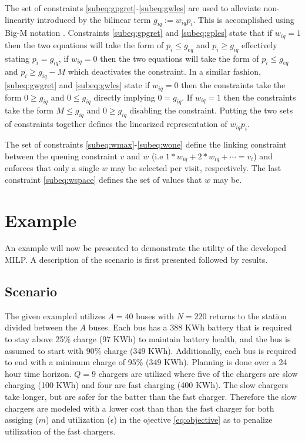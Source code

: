 \documentclass[letterpaper, 10pt, conference]{IEEEtran}
\begin{document}
The set of constraints \eqref{subeq:gpgret}-\eqref{subeq:gwles} are used to alleviate non-linearity introduced by the bilinear term \(g_{iq} := w_{iq} p_i\). This is accomplished using Big-M notation \cite{Rodriguez2013}. Constraints \eqref{subeq:gpgret} and \eqref{subeq:gples} state that if \(w_{iq} = 1\) then the two equations will take the form of \(p_i \leq g_{eq}\) and \(p_i \geq g_{iq}\) effectively stating \(p_i = g_{iq}\), if \(w_{iq} = 0\) then the two equations will take the form of \(p_i \leq g_{eq}\) and \(p_i \geq g_{iq} - M\) which deactivates the constraint. In a similar fashion, \eqref{subeq:gwgret} and \eqref{subeq:gwles} state if \(w_{iq} = 0\) then the constraints take the form \(0 \geq g_{iq}\) and \(0 \leq g_{iq}\) directly implying \(0 = g_{iq}\). If \(w_{iq} = 1\) then the constraints take the form \(M \leq g_{iq}\) and \(0 \geq g_{iq}\) disabling the constraint. Putting the two sets of constraints together defines the linearized representation of \(w_{iq} p_i\).

The set of constraints \eqref{subeq:wmax}-\eqref{subeq:wone} define the linking constraint between the queuing constraint \(v\) and \(w\) (i.e \(1*w_{iq} + 2*w_{iq} + \cdots = v_i\)) and enforces that only a single \(w\) may be selected per visit, respectively. The last constraint \eqref{subeq:wspace} defines the set of values that \(w\) may be.

\section{Example}
\label{sec:example}

An example will now be presented to demonstrate the utility of the developed MILP. A description of the scenario is first presented followed by results.

\subsection{Scenario}
The given exampled utilizes \(A = 40\) buses with \(N = 220\) returns to the station divided between the \(A\) buses. Each bus has a 388 KWh battery that is required to stay above 25\% charge (97 KWh) to maintain battery health, and the bus is assumed to start with 90\% charge (349 KWh). Additionally, each bus is required to end with a minimum charge of 95\% (349 KWh). Planning is done over a 24 hour time horizon. \(Q = 9\) chargers are utilized where five of the chargers are slow charging (100 KWh) and four are fast charging (400 KWh). The slow chargers take longer, but are safer for the batter than the fast charger. Therefore the slow chargers are modeled with a lower cost than than the fast charger for both assiging (\(m\)) and utilization (\(\epsilon\)) in the ojective \eqref{eq:objective} as to penalize utilization of the fast chargers.
\end{document}

